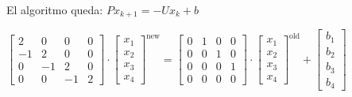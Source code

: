 \begin{itemize}
El algoritmo queda: $Px_{k+1}=-Ux_k+b$

$\begin{bmatrix}
	2& 0 & 0 & 0 \\
	-1 & 2 & 0 & 0 \\
	0 & -1 & 2 & 0 \\
	0 & 0 & -1 & 2
\end{bmatrix}\cdot\begin{bmatrix}
x_1\\
x_2\\
x_3\\
x_4
\end{bmatrix}^{\mathrm{new}}=\begin{bmatrix}
0 & 1 & 0 & 0\\
0 & 0 & 1 & 0\\
0 & 0 & 0 & 1\\
0 & 0 & 0 & 0
\end{bmatrix}\cdot\begin{bmatrix}
x_1\\
x_2\\
x_3\\
x_4
\end{bmatrix}^{\mathrm{old}}+\begin{bmatrix}
b_1\\
b_2\\
b_3\\
b_4
\end{bmatrix}$


\end{itemize}
